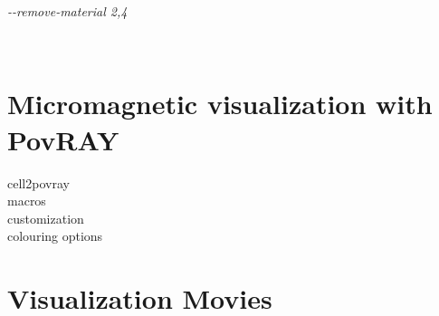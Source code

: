 \begin{minipage}[c]{\textwidth}
\centering
\textit{-{}-remove-material 2,4}
\end{minipage}\\

\section*{Micromagnetic visualization with PovRAY}
cell2povray\\
macros\\
customization\\
colouring options\\

\section*{Visualization Movies}

